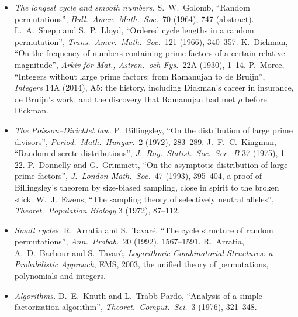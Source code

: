 \begin{itemize}
\item \emph{The longest cycle and smooth numbers.} S.~W.~Golomb, ``Random permutations'', \emph{Bull.\ Amer.\ Math.\ Soc.}\ 70 (1964), 747 (abstract). L.~A.~Shepp and S.~P.~Lloyd, ``Ordered cycle lengths in a random permutation'', \emph{Trans.\ Amer.\ Math.\ Soc.}\ 121 (1966), 340--357.
K.~Dickman, ``On the frequency of numbers containing prime factors of a certain relative magnitude'', \emph{Arkiv f\"or Mat., Astron.\ och Fys.}\ 22A (1930), 1--14. P.~Moree, ``Integers without large prime factors: from Ramanujan to de Bruijn'', \emph{Integers} 14A (2014), A5: the history,
including Dickman's career in insurance, de Bruijn's work, and the discovery that Ramanujan had met $\rho$ before Dickman.
\item \emph{The Poisson--Dirichlet law.} P.~Billingsley, ``On the distribution of large prime divisors'', \emph{Period.\ Math.\ Hungar.}\ 2 (1972), 283--289. J.~F.~C.~Kingman, ``Random discrete distributions'', \emph{J.\ Roy.\ Statist.\ Soc.\ Ser.\ B} 37 (1975), 1--22.
P.~Donnelly and G.~Grimmett, ``On the asymptotic distribution of large prime factors'', \emph{J.\ London Math.\ Soc.}\ 47 (1993), 395--404, a proof of Billingsley's theorem by size-biased sampling, close in spirit to the broken stick. W.~J.~Ewens, ``The sampling theory of selectively neutral alleles'',
\emph{Theoret.\ Population Biology} 3 (1972), 87--112.
\item \emph{Small cycles.} R.~Arratia and S.~Tavar\'e, ``The cycle structure of random permutations'', \emph{Ann.\ Probab.}\ 20 (1992), 1567--1591. R.~Arratia, A.~D.~Barbour and S.~Tavar\'e, \emph{Logarithmic Combinatorial Structures: a Probabilistic Approach}, EMS, 2003, the
unified theory of permutations, polynomials and integers.
\item \emph{Algorithms.} D.~E.~Knuth and L.~Trabb Pardo, ``Analysis of a simple factorization algorithm'', \emph{Theoret.\ Comput.\ Sci.}\ 3 (1976), 321--348.
\end{itemize}
